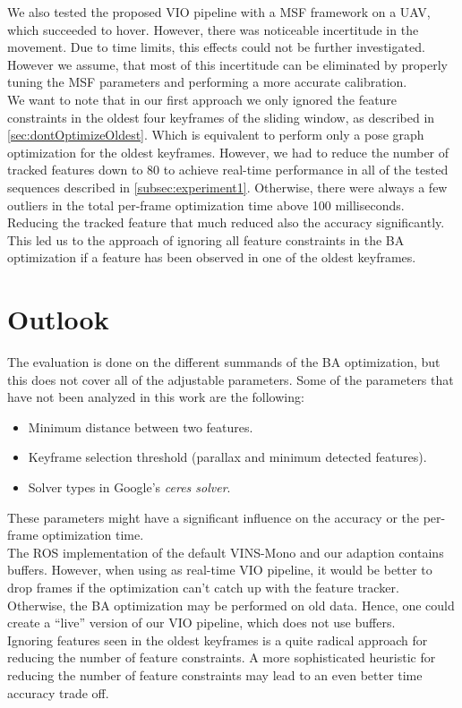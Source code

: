 We also tested the proposed \ac{VIO} pipeline with a \ac{MSF} framework on a 
\ac{UAV}, which succeeded to hover. However, there was noticeable incertitude 
in the movement. Due to time limits, this effects could not be further 
investigated. However we assume, that most of this incertitude can be 
eliminated by properly tuning the \ac{MSF} parameters and performing a more 
accurate calibration.\\

We want to note that in our first approach we only ignored the feature 
constraints in the oldest four keyframes of the sliding window, as described in 
\autoref{sec:dontOptimizeOldest}. Which is equivalent to perform only a pose 
graph optimization for the oldest keyframes. However, we had to reduce the 
number of tracked features down to 80 to achieve real-time performance in all 
of the tested sequences described in \autoref{subsec:experiment1}. Otherwise, 
there were always a few outliers in the total per-frame optimization time above 
100 milliseconds. Reducing the tracked feature that much reduced also the 
accuracy significantly. This led us to the approach of ignoring all feature
constraints in the \ac{BA} optimization if a feature has been observed in one 
of the oldest keyframes. 

\section{Outlook}
The evaluation is done on the different summands of the \ac{BA} 
optimization, but this does 
not cover all of the adjustable parameters. Some of the parameters that have 
not been analyzed in this work are the following:
\begin{itemize}
 \item Minimum distance between two features.
 \item Keyframe selection threshold (parallax and minimum detected features).
 \item Solver types in Google's \textit{ceres solver}\citep{ceres-solver}.
\end{itemize}
These parameters might have a significant influence on the accuracy or the 
per-frame optimization time. \\

The \ac{ROS} implementation of the default VINS-Mono and our adaption contains 
buffers. However, when using as real-time \ac{VIO} pipeline, it would be better 
to drop frames if the optimization can't catch up with the feature tracker. 
Otherwise, the \ac{BA} optimization may be performed on old data. Hence, one 
could create a ``live'' version of our \ac{VIO} pipeline, which does not use 
buffers. \\

Ignoring features seen in the oldest keyframes is a quite radical approach for 
reducing the number of feature constraints. A more sophisticated heuristic for 
reducing the number of feature constraints may lead to an even better time 
accuracy trade off.

